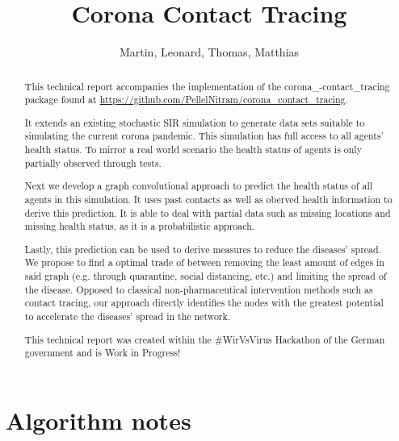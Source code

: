 \documentclass[]{article}
\title{Corona Contact Tracing}
\author{Martin, Leonard, Thomas, Matthias}
\begin{document}
\maketitle

\begin{abstract}
	This technical report accompanies the implementation of the corona\_-contact\_tracing package found at \url{https://github.com/PellelNitram/corona_contact_tracing}.

	It extends an existing stochastic SIR simulation to generate data sets suitable to simulating the current corona pandemic.
	This simulation has full access to all agents' health status.
	To mirror a real world scenario the health status of agents is only partially observed through tests.

	Next we develop a graph convolutional approach to predict the health status of all agents in this simulation.
	It uses past contacts as well as oberved health information to derive this prediction.
	It is able to deal with partial data such as missing locations and missing health status, as it is a probabilistic approach.
	
	Lastly, this prediction can be used to derive measures to reduce the diseases' spread.
	We propose to find a optimal trade of between removing the least amount of edges in said graph (e.g. through quarantine, social distancing, etc.) and limiting the spread of the disease.
	Opposed to classical non-pharmaceutical intervention methods such as contact tracing, our approach directly identifies the nodes with the greatest potential to accelerate the diseases' spread in the network.
	
	This technical report was created within the \#WirVsVirus Hackathon of the German government and is Work in Progress!
\end{abstract}

\section{Algorithm notes}
\end{document}
